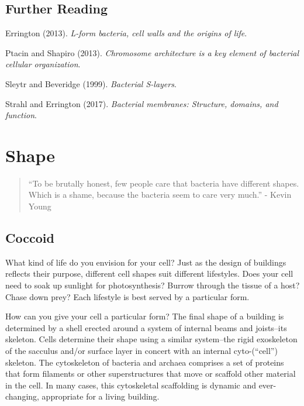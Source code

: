 \documentclass[]{tufte-book}
\begin{document}
\section{Further Reading}\label{further-reading}

Errington (2013). \emph{L-form bacteria, cell walls and the origins of
life}.\citep{errington2013}

Ptacin and Shapiro (2013). \emph{Chromosome architecture is a key
element of bacterial cellular organization}.\citep{ptacin2013}

Sleytr and Beveridge (1999). \emph{Bacterial
S-layers}.\citep{sleytr1999}

Strahl and Errington (2017). \emph{Bacterial membranes: Structure,
domains, and function}.\citep{strahl2017}

\chapter{Shape}\label{shape}

\begin{quote}
``To be brutally honest, few people care that bacteria have different
shapes. Which is a shame, because the bacteria seem to care very much.''
- Kevin Young \citep{young2006}
\end{quote}

\section{Coccoid}\label{coccoid}

What kind of life do you envision for your cell? Just as the design of
buildings reflects their purpose, different cell shapes suit different
lifestyles. Does your cell need to soak up sunlight for photosynthesis?
Burrow through the tissue of a host? Chase down prey? Each lifestyle is
best served by a particular form.

How can you give your cell a particular form? The final shape of a
building is determined by a shell erected around a system of internal
beams and joists--its skeleton. Cells determine their shape using a
similar system--the rigid exoskeleton of the sacculus and/or surface
layer in concert with an internal cyto-(``cell'') skeleton. The
cytoskeleton of bacteria and archaea comprises a set of proteins that
form filaments or other superstructures that move or scaffold other
material in the cell. In many cases, this cytoskeletal scaffolding is
dynamic and ever-changing, appropriate for a living building.
\end{document}
